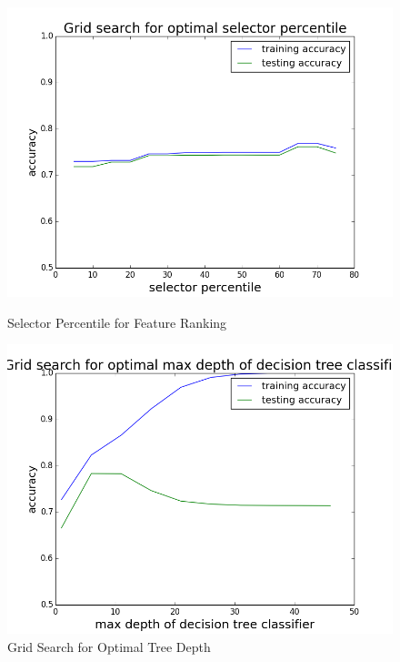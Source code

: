 \documentclass[12pt,twocolumn]{article}
\begin{document}
\begin{figure}
\centering
\begin{minipage}{0.5\linewidth}

\includegraphics[width=\linewidth]{selector_percentile_grid_search}
\caption{Selector Percentile for Feature Ranking}
\label{fig:selectorpercentilegridsearch}

\end{minipage}\hfill
\begin{minipage}{0.5\linewidth}

\includegraphics[width=\linewidth]{max_depth_grid}
\caption{ Grid Search for Optimal Tree Depth}
\label{fig:max_depth_grid}

 \end{minipage}
\end{figure}
\end{document}
